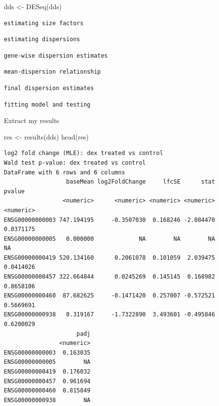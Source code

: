 \documentclass[
  letterpaper,
  DIV=11,
  numbers=noendperiod]{scrartcl}
\newenvironment{Shaded}{\begin{snugshade}}{\end{snugshade}}
\newcommand{\FunctionTok}[1]{\textcolor[rgb]{0.28,0.35,0.67}{#1}}
\newcommand{\NormalTok}[1]{\textcolor[rgb]{0.00,0.23,0.31}{#1}}
\newcommand{\OtherTok}[1]{\textcolor[rgb]{0.00,0.23,0.31}{#1}}
\begin{document}
\begin{Shaded}
\begin{Highlighting}[]
\NormalTok{dds }\OtherTok{\textless{}{-}} \FunctionTok{DESeq}\NormalTok{(dds)}
\end{Highlighting}
\end{Shaded}

\begin{verbatim}
estimating size factors
\end{verbatim}

\begin{verbatim}
estimating dispersions
\end{verbatim}

\begin{verbatim}
gene-wise dispersion estimates
\end{verbatim}

\begin{verbatim}
mean-dispersion relationship
\end{verbatim}

\begin{verbatim}
final dispersion estimates
\end{verbatim}

\begin{verbatim}
fitting model and testing
\end{verbatim}

Extract my results

\begin{Shaded}
\begin{Highlighting}[]
\NormalTok{res }\OtherTok{\textless{}{-}} \FunctionTok{results}\NormalTok{(dds)}
\FunctionTok{head}\NormalTok{(res)}
\end{Highlighting}
\end{Shaded}

\begin{verbatim}
log2 fold change (MLE): dex treated vs control 
Wald test p-value: dex treated vs control 
DataFrame with 6 rows and 6 columns
                  baseMean log2FoldChange     lfcSE      stat    pvalue
                 <numeric>      <numeric> <numeric> <numeric> <numeric>
ENSG00000000003 747.194195     -0.3507030  0.168246 -2.084470 0.0371175
ENSG00000000005   0.000000             NA        NA        NA        NA
ENSG00000000419 520.134160      0.2061078  0.101059  2.039475 0.0414026
ENSG00000000457 322.664844      0.0245269  0.145145  0.168982 0.8658106
ENSG00000000460  87.682625     -0.1471420  0.257007 -0.572521 0.5669691
ENSG00000000938   0.319167     -1.7322890  3.493601 -0.495846 0.6200029
                     padj
                <numeric>
ENSG00000000003  0.163035
ENSG00000000005        NA
ENSG00000000419  0.176032
ENSG00000000457  0.961694
ENSG00000000460  0.815849
ENSG00000000938        NA
\end{verbatim}
\end{document}
